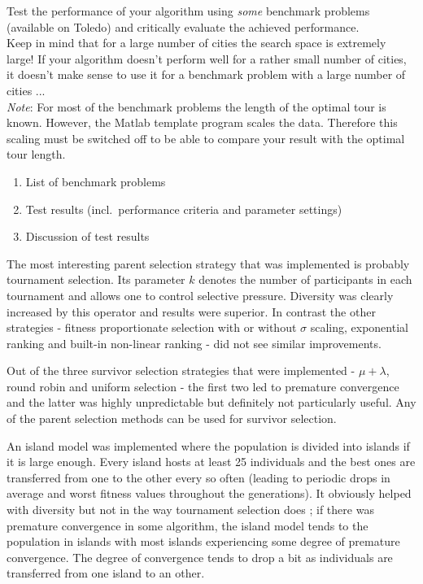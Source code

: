 Test the performance of your algorithm using \emph{some} benchmark problems (available on Toledo) and critically evaluate the achieved performance.\\
{\small
Keep in mind that for a large number of cities the search space is extremely large! If your algorithm doesn't perform well for a rather small number of cities, it doesn't make sense to use it for a benchmark problem with a  large number of cities ...\\
\emph{Note}: For most of the benchmark problems the length of the optimal tour is known. However, the Matlab template program scales the data. Therefore this scaling must be switched off to be able to compare your result with the optimal tour length.
}
\begin{enumerate}
\item	 List of benchmark problems
\item Test results (incl.\ performance criteria and parameter settings)
\item Discussion of test results

\end{enumerate}



The most interesting parent selection strategy that was implemented is probably tournament selection. Its parameter $k$ denotes the number of participants in each tournament and allows one to control selective pressure. Diversity was clearly increased by this operator and results were superior. In contrast the other strategies - fitness proportionate selection with or without $\sigma$ scaling, exponential ranking and built-in non-linear ranking - did not see similar improvements.


Out of the three survivor selection strategies that were implemented - $\mu+\lambda$, round robin and uniform selection - the first two led to premature convergence and the latter was highly unpredictable but definitely not particularly useful. Any of the parent selection methods can be used for survivor selection.


An island model was implemented where the population is divided into islands if it is large enough. Every island hosts at least 25 individuals and the best ones are transferred from one to the other every so often (leading to periodic drops in average and worst fitness values throughout the generations). It obviously helped with diversity but not in the way tournament selection does ; if there was premature convergence in some algorithm, the island model tends to the population in islands with most islands experiencing some degree of premature convergence. The degree of convergence tends to drop a bit as individuals are transferred from one island to an other.

